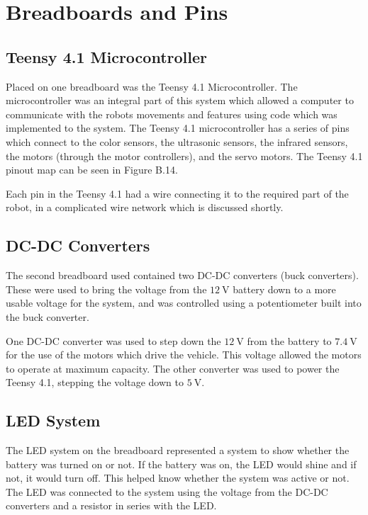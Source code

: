 \documentclass[11pt]{report}
\begin{document}
\section{Breadboards and Pins}\label{sec:breadboard-and-pins}
\subsection{Teensy 4.1 Microcontroller}
Placed on one breadboard was the Teensy 4.1 Microcontroller. The microcontroller was an integral part of this system which allowed a computer to communicate with the robots movements and features using code which was implemented to the system. The Teensy 4.1 microcontroller has a series of pins which connect to the color sensors, the ultrasonic sensors, the infrared sensors, the motors (through the motor controllers), and the servo motors. The Teensy 4.1 pinout map can be seen in Figure B.14. 
\par Each pin in the Teensy 4.1 had a wire connecting it to the required part of the robot, in a complicated wire network which is discussed shortly. 

\subsection{DC-DC Converters}
The second breadboard used contained two \gls{DC}-\gls{DC} converters (buck converters). These were used to bring the voltage from the $\SI{12}{\volt}$ battery down to a more usable voltage for the system, and was controlled using a potentiometer built into the buck converter. 
\par One DC-DC converter was used to step down the $\SI{12}{\volt}$ from the battery to $\SI{7.4}{\volt}$ for the use of the motors which drive the vehicle. This voltage allowed the motors to operate at maximum capacity. The other converter was used to power the Teensy 4.1, stepping the voltage down to $\SI{5}{\volt}$.

\subsection{LED System}
The \gls{LED} system on the breadboard represented a system to show whether the battery was turned on or not. If the battery was on, the \gls{LED} would shine and if not, it would turn off. This helped know whether the system was active or not. The \gls{LED} was connected to the system using the voltage from the \gls{DC}-\gls{DC} converters and a resistor in series with the \gls{LED}.
\end{document}
